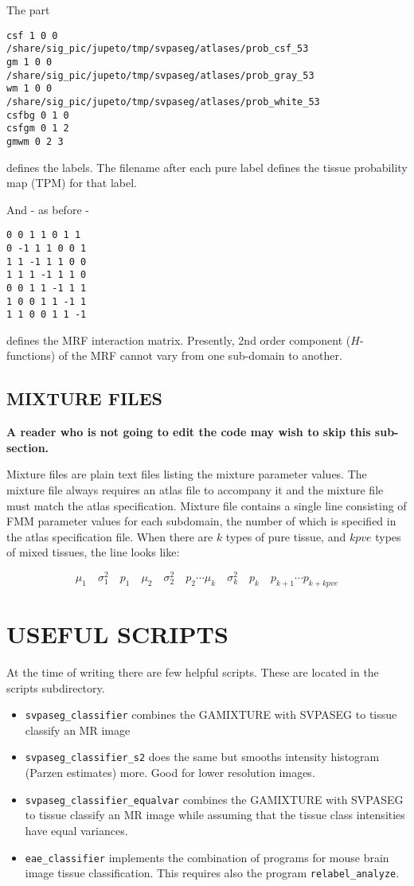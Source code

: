 \documentclass[12pt]{article}
\begin{document}
The part 
\begin{verbatim}
csf 1 0 0
/share/sig_pic/jupeto/tmp/svpaseg/atlases/prob_csf_53
gm 1 0 0
/share/sig_pic/jupeto/tmp/svpaseg/atlases/prob_gray_53
wm 1 0 0
/share/sig_pic/jupeto/tmp/svpaseg/atlases/prob_white_53
csfbg 0 1 0
csfgm 0 1 2
gmwm 0 2 3
\end{verbatim}
defines the labels. The filename after each pure label defines the tissue probability map (TPM) for that label.

And - as before -
\begin{verbatim}
0 0 1 1 0 1 1
0 -1 1 1 0 0 1
1 1 -1 1 1 0 0
1 1 1 -1 1 1 0
0 0 1 1 -1 1 1
1 0 0 1 1 -1 1
1 1 0 0 1 1 -1
\end{verbatim}
defines the MRF interaction matrix. Presently, 2nd order component ($H$-functions) of the MRF cannot vary from one sub-domain to another.

  
\subsection{MIXTURE FILES}
{\bf A reader who is not going to edit the code may wish to skip this sub-section.}

 
Mixture files are plain text files listing the mixture
parameter values. The mixture file always requires an atlas file to
accompany it and the mixture file must match the atlas
specification. Mixture file contains a single line consisting of FMM
parameter values for each subdomain, the number of which is specified in the 
atlas specification file. When there are $k$ types of pure tissue, and
$kpve$ types of mixed tissues, the line looks like: 

$$
\mu_1 \quad  \sigma_1^2 \quad p_1 \quad \mu_2 \quad \sigma_2^2 \quad
p_2 \cdots \mu_k \quad \sigma_k^2 \quad p_k \quad  p_{k+1} \cdots p_{k + kpve} 
$$

\section{USEFUL SCRIPTS}
\label{sect:sect4}
At the time of writing there are few helpful scripts. These are located in the scripts subdirectory. 
\begin{itemize}

\item {\tt svpaseg\_classifier} combines the GAMIXTURE with SVPASEG to tissue
classify an MR image

\item {\tt svpaseg\_classifier\_s2} does the same but smooths intensity histogram
(Parzen estimates) more. Good for lower resolution images.

\item {\tt svpaseg\_classifier\_equalvar} combines the GAMIXTURE with SVPASEG to tissue
classify an MR image while assuming that the tissue class intensities have equal variances.

\item {\tt eae\_classifier} implements the combination of programs for mouse
brain image tissue classification. This requires also the program 
{\tt relabel\_analyze}.

\end{itemize}
\end{document}
